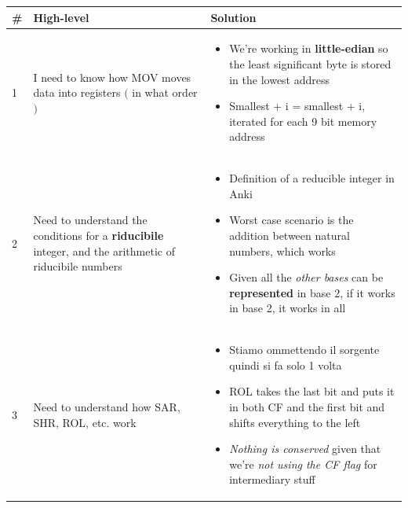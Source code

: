 \documentclass[a4paper,12pt]{article}
\begin{document}
\noindent\hspace*{-1.5cm}
    \begin{tabular}{|C{0.7cm}|C{8cm}|C{8cm}|}
        \hline
        \textbf{\#} & \textbf{High-level} & \textbf{Solution} \\
        
        \hline
        
        1 
        &
        I need to know how MOV moves data into registers $($ in what order $)$
        & 
        \begin{itemize}[label=\(\rightarrow\)]
            \item We're working in \textbf{little-edian} so the least significant byte is stored in the lowest address
            \item Smallest + i = smallest + i, iterated for each 9 bit memory address
        \end{itemize}   
        \\
        
        \hline


        2
        &
        Need to understand the conditions for a \textbf{riducibile} integer, and the arithmetic of riducibile numbers
        &
         \begin{itemize}[label=\(\rightarrow\)]
            \item Definition of a reducible integer in Anki 
            \item Worst case scenario is the addition between natural numbers, which works
            \item Given all the \textit{other bases} can be \textbf{represented} in base 2, if it works in base 2, it works in all 
        \end{itemize}   
        \\

        \hline

        3
        &
        Need to understand how SAR, SHR, ROL, etc. work
        &
         \begin{itemize}[label=\(\rightarrow\)]
            \item Stiamo ommettendo il sorgente quindi si fa solo 1 volta
            \item ROL takes the last bit and puts it in both CF and the first bit and shifts everything to the left
            \item \textit{Nothing is conserved} given that we're \textit{not using the CF flag} for intermediary stuff
        \end{itemize}
        

\end{tabular}
\end{document}
